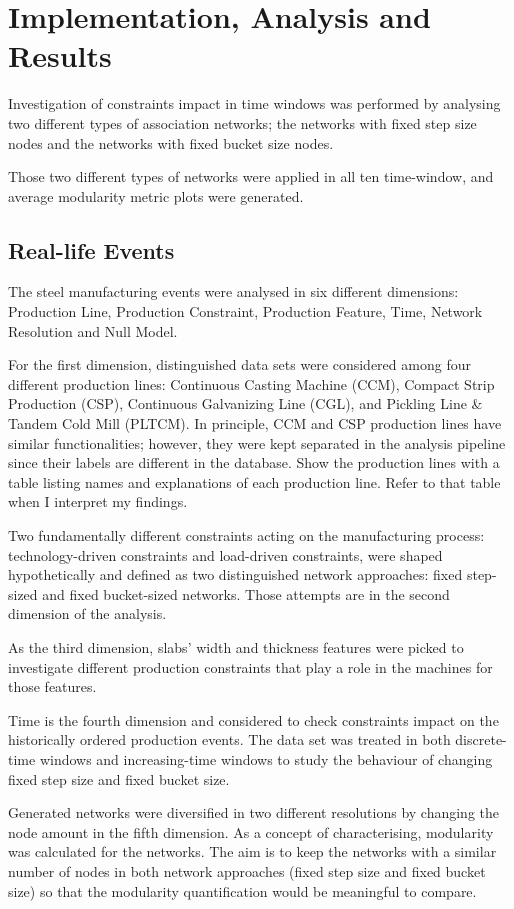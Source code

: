 \chapter{Implementation, Analysis and Results}
{\color{red} 
	Investigation of constraints impact in time windows was performed by analysing two different types of association networks; the networks with fixed step size nodes and the networks with fixed bucket size nodes.
	
	Those two different types of networks were applied in all ten time-window, and average modularity metric plots were generated. 
}

\section{Real-life Events}
The steel manufacturing events were analysed in six different dimensions: Production Line, Production Constraint, Production Feature, Time, Network Resolution and Null Model.

For the first dimension, distinguished data sets were considered among four different production lines: Continuous Casting Machine (CCM), Compact Strip Production (CSP), Continuous Galvanizing Line (CGL), and Pickling Line \& Tandem Cold Mill (PLTCM). In principle, CCM and CSP production lines have similar functionalities; however, they were kept separated in the analysis pipeline since their labels are different in the database.
{\color{red}
	Show the production lines with a table listing names and explanations of each production line. Refer to that table when I interpret my findings.
}

Two fundamentally different constraints acting on the manufacturing process: technology-driven constraints and load-driven constraints, were shaped hypothetically and defined as two distinguished network approaches: fixed step-sized and fixed bucket-sized networks. Those attempts are in the second dimension of the analysis. 

As the third dimension, slabs' width and thickness features were picked to investigate different production constraints that play a role in the machines for those features. 

Time is the fourth dimension and considered to check constraints impact on the historically ordered production events. The data set was treated in both discrete-time windows and increasing-time windows to study the behaviour of changing fixed step size and fixed bucket size. 

Generated networks were diversified in two different resolutions by changing the node amount in the fifth dimension. As a concept of characterising, modularity was calculated for the networks. The aim is to keep the networks with a similar number of nodes in both network approaches (fixed step size and fixed bucket size) so that the modularity quantification would be meaningful to compare. 


